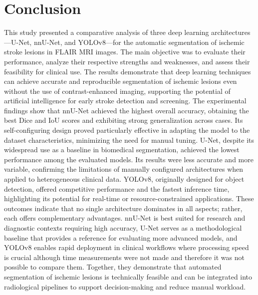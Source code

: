 \documentclass[12pt]{article}
\begin{document}
\section{Conclusion}\label{sec:conclusion}


This study presented a comparative analysis of three deep learning architectures—U-Net, nnU-Net, and YOLOv8—for the automatic segmentation of ischemic stroke lesions in FLAIR MRI images. The main objective was to evaluate their performance, analyze their respective strengths and weaknesses, and assess their feasibility for clinical use. The results demonstrate that deep learning techniques can achieve accurate and reproducible segmentation of ischemic lesions even without the use of contrast-enhanced imaging, supporting the potential of artificial intelligence for early stroke detection and screening.
%
The experimental findings show that nnU-Net achieved the highest overall accuracy, obtaining the best Dice and IoU scores and exhibiting strong generalization across cases. Its self-configuring design proved particularly effective in adapting the model to the dataset characteristics, minimizing the need for manual tuning. U-Net, despite its widespread use as a baseline in biomedical segmentation, achieved the lowest performance among the evaluated models. Its results were less accurate and more variable, confirming the limitations of manually configured architectures when applied to heterogeneous clinical data. YOLOv8, originally designed for object detection, offered competitive performance and the fastest inference time, highlighting its potential for real-time or resource-constrained applications.
%
These outcomes indicate that no single architecture dominates in all aspects; rather, each offers complementary advantages. nnU-Net is best suited for research and diagnostic contexts requiring high accuracy, U-Net serves as a methodological baseline that provides a reference for evaluating more advanced models, and YOLOv8 enables rapid deployment in clinical workflows where processing speed is crucial although time measurements were not made and therefore it was not possible to compare them. Together, they demonstrate that automated segmentation of ischemic lesions is technically feasible and can be integrated into radiological pipelines to support decision-making and reduce manual workload.
\end{document}
